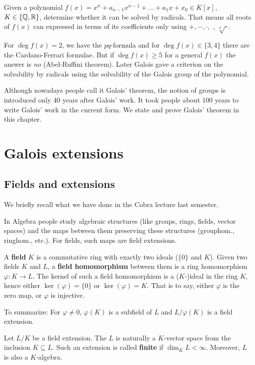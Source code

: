 \documentclass[twoside = false,	%
		headsepline,		%
		parskip = true,
		]{scrbook}						%
\begin{document}
    Given a polynomial $f(x) = x^n + a_{n-1}x^{n-1} + \dots + a_1x + x_0 \in K[x]$, $K \in \{\mathbb Q,\mathbb R\}$, determine whether it can be solved by radicals. That means all roots of $f(x)$ can expressed in terms of its coefficients only using $+,-,\cdot,$ \textdiv, $\sqrt[k]{\cdot}$.

    For $\deg f(x) = 2$, we have the $pq$-formula and for $\deg f(x) \in \{3,4\}$ there are the Cardano-Ferrari formulae. But if $\deg f(x) \geq 5$ for a general $f(x)$ the answer is \textit{no} (Abel-Ruffini theorem). Later Galois gave a criterion on the solvability by radicals using the solvability of the Galois group of the polynomial.
    
    Although nowadays people call it Galois' theorem, the notion of groups is introduced only 40 years after Galois' work. It took people about $100$ years to write Galois' work in the current form.
    We state and prove Galois' theorem in this chapter.
    
\section{Galois extensions}
    \subsection{Fields and extensions}
        We briefly recall what we have done in the Cobra lecture \cite{Cobra} last semester.
        
        In Algebra people study algebraic structures (like groups, rings, fields, vector spaces) and the maps between them preserving these structures (grouphom., ringhom., etc.). For fields, such maps are field extensions.
        
        A \textbf{field} $K$ is a commutative ring with exactly two ideals ($\{0\}$ and $K$).
        Given two fields $K$ and $L$, a \textbf{field homomorphism} between them is a ring homomorphism $\varphi: K \rightarrow L$. The kernel of such a field homomorphism is a ($K$-)ideal in the ring $K$, hence either $\ker(\varphi) = \{0\}$ or $\ker(\varphi) = K$. That is to say, either $\varphi$ is the zero map, or $\varphi$ is injective.
        
        To summarize: For $\varphi \neq 0$, $\varphi(K)$ is a subfield of $L$ and $L/\varphi(K)$ is a field extension.
        
        Let $L/K$ be a field extension. The $L$ is naturally a $K$-vector space from the inclusion $K \subseteq L$. Such an extension is called \textbf{finite} if $\dim_K L < \infty$. Moreover, $L$ is also a $K$-algebra.
        
\end{document}
